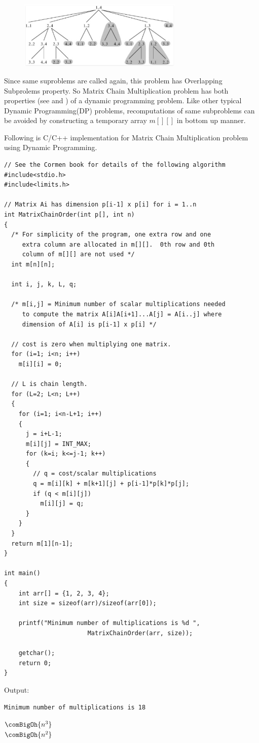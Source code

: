 \begin{figure}
\centering
\includegraphics[width=0.7\textwidth]{Images/figGFGDPSet8MatChainMult}
\label{figGFGDPSet8MatChainMult}
\end{figure}

Since same suproblems are called again, this problem has Overlapping
Subprolems property. So Matrix Chain Multiplication problem has both
properties (see  and
) of a dynamic programming problem.
Like other typical Dynamic Programming(DP) problems, recomputations of same
subproblems can be avoided by constructing a temporary array $m[][]$ in
bottom up manner.


Following is C/C++ implementation for Matrix Chain Multiplication problem
using Dynamic Programming.
\begin{lstlisting}[style=raycppnewsnippet]
// See the Cormen book for details of the following algorithm
#include<stdio.h>
#include<limits.h>
 
// Matrix Ai has dimension p[i-1] x p[i] for i = 1..n
int MatrixChainOrder(int p[], int n)
{
  /* For simplicity of the program, one extra row and one
     extra column are allocated in m[][].  0th row and 0th
     column of m[][] are not used */
  int m[n][n];
 
  int i, j, k, L, q;
 
  /* m[i,j] = Minimum number of scalar multiplications needed
     to compute the matrix A[i]A[i+1]...A[j] = A[i..j] where
     dimension of A[i] is p[i-1] x p[i] */
 
  // cost is zero when multiplying one matrix.
  for (i=1; i<n; i++)
    m[i][i] = 0;
 
  // L is chain length.
  for (L=2; L<n; L++)
  {
    for (i=1; i<n-L+1; i++)
    {
      j = i+L-1;
      m[i][j] = INT_MAX;
      for (k=i; k<=j-1; k++)
      {
        // q = cost/scalar multiplications
        q = m[i][k] + m[k+1][j] + p[i-1]*p[k]*p[j];
        if (q < m[i][j])
          m[i][j] = q;
      }
    }
  }
  return m[1][n-1];
}

int main()
{
    int arr[] = {1, 2, 3, 4};
    int size = sizeof(arr)/sizeof(arr[0]);
 
    printf("Minimum number of multiplications is %d ",
                       MatrixChainOrder(arr, size));
 
    getchar();
    return 0;
}
\end{lstlisting}
Output:
\begin{lstlisting}[style=rayio]
Minimum number of multiplications is 18
\end{lstlisting}
 $\comBigOh{n^3}$\\
 $\comBigOh{n^2}$

